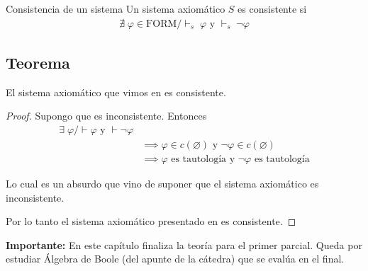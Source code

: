 \begin{definicion}{Consistencia de un sistema}{}
    Un sistema axiomático $S$ es consistente si
    \begin{gather*}
        \nexists \; \varphi \in \mathrm{FORM} / {\vdash}_{s}\; \varphi 
        \text{ y } {\vdash}_{s}\; \neg\varphi
    \end{gather*}

\end{definicion}

\subsection{Teorema}

\begin{teorema}{}{}
    El sistema axiomático que vimos en
    es consistente.
\end{teorema}

\begin{proof} \phantom{.}

    Supongo que es inconsistente. Entonces
    \begin{align*}
        \exists \; \varphi / \vdash \varphi \text{ y } \vdash \neg \varphi&\\
        &\implies \varphi \in c(\varnothing) \text{ y } 
        \neg\varphi \in c(\varnothing) \\
        &\implies \varphi \text{ es tautología y } 
        \neg \varphi \text{ es tautología}
    \end{align*}

    Lo cual es un absurdo que vino de suponer que el sistema axiomático
    es inconsistente.

    Por lo tanto el sistema axiomático presentado en
    es consistente.

\end{proof}

\textbf{Importante:} En este capítulo finaliza la teoría para el primer 
parcial. Queda por estudiar Álgebra de Boole (del apunte de la cátedra) que 
se evalúa en el final.
